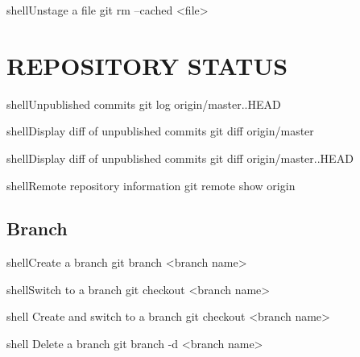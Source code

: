 \documentclass[10pt,a4paper]{article}
\begin{document}
\begin{multicols}{3}
\begin{codebox}{shell}{Unstage a file}
git rm --cached <file>

\end{codebox}

\section{REPOSITORY STATUS}

\begin{codebox}{shell}{Unpublished commits}
git log origin/master..HEAD

\end{codebox}

\begin{codebox}{shell}{Display diff of unpublished commits}
git diff origin/master

\end{codebox}

\begin{codebox}{shell}{Display diff of unpublished commits}
git diff origin/master..HEAD

\end{codebox}

\begin{codebox}{shell}{Remote repository information}
git remote show origin

\end{codebox}

\subsection{Branch}

\begin{codebox}{shell}{Create a branch}
git branch <branch name>

\end{codebox}

\begin{codebox}{shell}{Switch to a branch}
git checkout <branch name>

\end{codebox}

\begin{codebox}{shell}{}
Create and switch to a branch
git checkout <branch name>

\end{codebox}

\begin{codebox}{shell}{}
Delete a branch
git branch -d <branch name>


\end{codebox}
\end{multicols}
\end{document}
